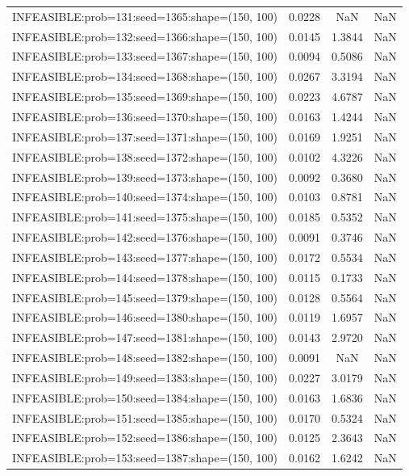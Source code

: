 \begin{longtable}{lccc}
INFEASIBLE:prob=131:seed=1365:shape=(150, 100) & 0.0228 &     NaN &    NaN \\
INFEASIBLE:prob=132:seed=1366:shape=(150, 100) & 0.0145 &  1.3844 &    NaN \\
INFEASIBLE:prob=133:seed=1367:shape=(150, 100) & 0.0094 &  0.5086 &    NaN \\
INFEASIBLE:prob=134:seed=1368:shape=(150, 100) & 0.0267 &  3.3194 &    NaN \\
INFEASIBLE:prob=135:seed=1369:shape=(150, 100) & 0.0223 &  4.6787 &    NaN \\
INFEASIBLE:prob=136:seed=1370:shape=(150, 100) & 0.0163 &  1.4244 &    NaN \\
INFEASIBLE:prob=137:seed=1371:shape=(150, 100) & 0.0169 &  1.9251 &    NaN \\
INFEASIBLE:prob=138:seed=1372:shape=(150, 100) & 0.0102 &  4.3226 &    NaN \\
INFEASIBLE:prob=139:seed=1373:shape=(150, 100) & 0.0092 &  0.3680 &    NaN \\
INFEASIBLE:prob=140:seed=1374:shape=(150, 100) & 0.0103 &  0.8781 &    NaN \\
INFEASIBLE:prob=141:seed=1375:shape=(150, 100) & 0.0185 &  0.5352 &    NaN \\
INFEASIBLE:prob=142:seed=1376:shape=(150, 100) & 0.0091 &  0.3746 &    NaN \\
INFEASIBLE:prob=143:seed=1377:shape=(150, 100) & 0.0172 &  0.5534 &    NaN \\
INFEASIBLE:prob=144:seed=1378:shape=(150, 100) & 0.0115 &  0.1733 &    NaN \\
INFEASIBLE:prob=145:seed=1379:shape=(150, 100) & 0.0128 &  0.5564 &    NaN \\
INFEASIBLE:prob=146:seed=1380:shape=(150, 100) & 0.0119 &  1.6957 &    NaN \\
INFEASIBLE:prob=147:seed=1381:shape=(150, 100) & 0.0143 &  2.9720 &    NaN \\
INFEASIBLE:prob=148:seed=1382:shape=(150, 100) & 0.0091 &     NaN &    NaN \\
INFEASIBLE:prob=149:seed=1383:shape=(150, 100) & 0.0227 &  3.0179 &    NaN \\
INFEASIBLE:prob=150:seed=1384:shape=(150, 100) & 0.0163 &  1.6836 &    NaN \\
INFEASIBLE:prob=151:seed=1385:shape=(150, 100) & 0.0170 &  0.5324 &    NaN \\
INFEASIBLE:prob=152:seed=1386:shape=(150, 100) & 0.0125 &  2.3643 &    NaN \\
INFEASIBLE:prob=153:seed=1387:shape=(150, 100) & 0.0162 &  1.6242 &    NaN \\

\end{longtable}
